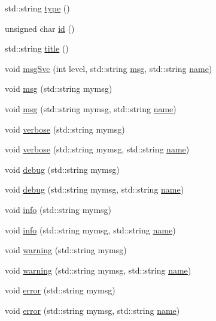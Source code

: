 \begin{DoxyCompactItemize}
std\+::string \hyperlink{classObject_a84f99f70f144a83e1582d1d0f84e4e62}{type} ()
\item 
unsigned char \hyperlink{classObject_af99145335cc61ff6e2798ea17db009d2}{id} ()
\item 
std\+::string \hyperlink{classObject_a73a0f1a41828fdd8303dd662446fb6c3}{title} ()
\item 
void \hyperlink{classObject_a3f9d5537ebce0c0f2bf6ae4d92426f3c}{msg\+Svc} (int level, std\+::string \hyperlink{classObject_a58b2d0618c2d08cf2383012611528d97}{msg}, std\+::string \hyperlink{classObject_a300f4c05dd468c7bb8b3c968868443c1}{name})
\item 
void \hyperlink{classObject_a58b2d0618c2d08cf2383012611528d97}{msg} (std\+::string mymsg)
\item 
void \hyperlink{classObject_ac5d59299273cee27aacf7de00d2e7034}{msg} (std\+::string mymsg, std\+::string \hyperlink{classObject_a300f4c05dd468c7bb8b3c968868443c1}{name})
\item 
void \hyperlink{classObject_a83d2db2df682907ea1115ad721c1c4a1}{verbose} (std\+::string mymsg)
\item 
void \hyperlink{classObject_a2d4120195317e2a3c6532e8bb9f3da68}{verbose} (std\+::string mymsg, std\+::string \hyperlink{classObject_a300f4c05dd468c7bb8b3c968868443c1}{name})
\item 
void \hyperlink{classObject_aac010553f022165573714b7014a15f0d}{debug} (std\+::string mymsg)
\item 
void \hyperlink{classObject_a6c9a0397ca804e04d675ed05683f5420}{debug} (std\+::string mymsg, std\+::string \hyperlink{classObject_a300f4c05dd468c7bb8b3c968868443c1}{name})
\item 
void \hyperlink{classObject_a644fd329ea4cb85f54fa6846484b84a8}{info} (std\+::string mymsg)
\item 
void \hyperlink{classObject_a1ca123253dfd30fc28b156f521dcbdae}{info} (std\+::string mymsg, std\+::string \hyperlink{classObject_a300f4c05dd468c7bb8b3c968868443c1}{name})
\item 
void \hyperlink{classObject_a65cd4fda577711660821fd2cd5a3b4c9}{warning} (std\+::string mymsg)
\item 
void \hyperlink{classObject_a11f101db4dd73d9391b0231818881d86}{warning} (std\+::string mymsg, std\+::string \hyperlink{classObject_a300f4c05dd468c7bb8b3c968868443c1}{name})
\item 
void \hyperlink{classObject_a204a95f57818c0f811933917a30eff45}{error} (std\+::string mymsg)
\item 
void \hyperlink{classObject_ad7f6c457733082efa2f9ff5f5c8e119a}{error} (std\+::string mymsg, std\+::string \hyperlink{classObject_a300f4c05dd468c7bb8b3c968868443c1}{name})

\end{DoxyCompactItemize}
